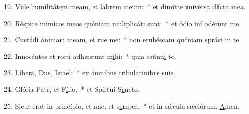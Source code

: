 19. Vide humilitátem meam, et labrem m\uline{e}um:~* et dimítte univérsa dlícta m\uline{e}a.\par 
20. Réspice inimícos meos quóniam multplic\uline{á}ti sunt:~* et ódio iní odér\uline{u}nt me.\par 
21. Custódi ánimam meam, et ru\uline{e} me:~* non erubéscam quóniam správi \uline{i}n te.\par 
22. Innocéntes et recti adhæsrunt m\uline{i}hi:~* quia sstínu\uline{i} te.\par 
23. Líbera, Dus, \uline{I}sraël:~* ex ómnibus tribulatinibus s\uline{u}is.\par 
24. Glória Patr, et F\uline{í}lio,~* et Spirtui S\uline{a}ncto.\par 
25. Sicut erat in princípio, et nnc, et s\uline{e}mper,~* et in sǽcula sæclórum. \uline{A}men.\par 
